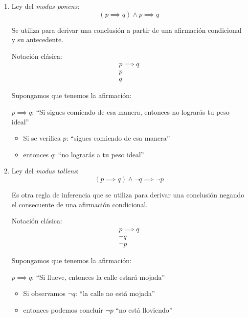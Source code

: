 \begin{enumerate}[label=\alph*)]
	\item Ley del \textit{modus ponens}: \label{def:ponens}
	\[ (p \implies q) \land p \implies q \]
	
	Se utiliza para derivar una conclusión a partir de una afirmación condicional y su antecedente.
	
	Notación clásica:
	\[
	\begin{array}{l}
		p  \implies q\\
		p \\ \hline
		q
	\end{array}
	\]
	
	\begin{fmd-example}
		Supongamos que tenemos la afirmación:
		
		\begin{center}
			$p \implies q$: ``Si sigues comiendo de esa manera, entonces no lograrás tu peso ideal''
		\end{center}
		
		\begin{itemize}			
			\item Si se verifica $p$: ``sigues comiendo de esa manera''
			\item entonces $q$: ``no lograrás a tu peso ideal''
		\end{itemize}
	\end{fmd-example}
	
	\item Ley del \textit{modus tollens}:
	\[ (p \implies q) \land \neg q \implies \neg p \]
	
	Es otra regla de inferencia que se utiliza para derivar una conclusión negando el consecuente de una afirmación condicional.
	
	Notación clásica:
	\[
	\begin{array}{l}
		p  \implies q\\
		\neg q \\ \hline
		\neg p
	\end{array}
	\]
	
	\begin{fmd-example}
		Supongamos que tenemos la afirmación:
		
		\begin{center}
			$p \implies q$: ``Si llueve, entonces la calle estará mojada''
		\end{center}
		
		\begin{itemize}
			\item Si observamos $\neg q$: ``la calle no está mojada''
			\item entonces podemos concluir $\neg p$ ``no está lloviendo''
		\end{itemize}
	\end{fmd-example}
	

\end{enumerate}
